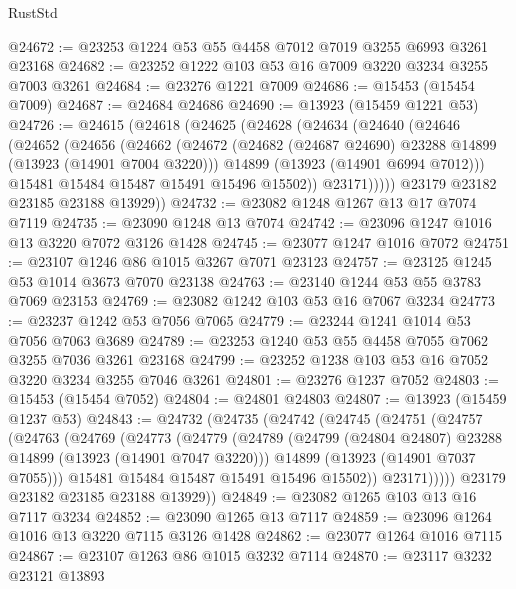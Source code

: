 \begin{lexlean}{RustStd}
\begin{coremodule}
@24672 := @23253 @1224 @53 @55 @4458 @7012 @7019 @3255 @6993 @3261 @23168
@24682 := @23252 @1222 @103 @53 @16 @7009 @3220 @3234 @3255 @7003 @3261
@24684 := @23276 @1221 @7009
@24686 := @15453 (@15454 @7009)
@24687 := @24684 @24686
@24690 := @13923 (@15459 @1221 @53)
@24726 := @24615
    (@24618
      (@24625
        (@24628
          (@24634
            (@24640
              (@24646
                (@24652
                  (@24656
                    (@24662
                      (@24672
                        (@24682 (@24687 @24690) @23288 @14899 (@13923 (@14901 @7004 @3220)))
                        @14899
                        (@13923 (@14901 @6994 @7012)))
                      @15481
                      @15484
                      @15487
                      @15491
                      @15496
                      @15502))
                  @23171)))))
        @23179
        @23182
        @23185
        @23188
        @13929))
@24732 := @23082 @1248 @1267 @13 @17 @7074 @7119
@24735 := @23090 @1248 @13 @7074
@24742 := @23096 @1247 @1016 @13 @3220 @7072 @3126 @1428
@24745 := @23077 @1247 @1016 @7072
@24751 := @23107 @1246 @86 @1015 @3267 @7071 @23123
@24757 := @23125 @1245 @53 @1014 @3673 @7070 @23138
@24763 := @23140 @1244 @53 @55 @3783 @7069 @23153
@24769 := @23082 @1242 @103 @53 @16 @7067 @3234
@24773 := @23237 @1242 @53 @7056 @7065
@24779 := @23244 @1241 @1014 @53 @7056 @7063 @3689
@24789 := @23253 @1240 @53 @55 @4458 @7055 @7062 @3255 @7036 @3261 @23168
@24799 := @23252 @1238 @103 @53 @16 @7052 @3220 @3234 @3255 @7046 @3261
@24801 := @23276 @1237 @7052
@24803 := @15453 (@15454 @7052)
@24804 := @24801 @24803
@24807 := @13923 (@15459 @1237 @53)
@24843 := @24732
    (@24735
      (@24742
        (@24745
          (@24751
            (@24757
              (@24763
                (@24769
                  (@24773
                    (@24779
                      (@24789
                        (@24799 (@24804 @24807) @23288 @14899 (@13923 (@14901 @7047 @3220)))
                        @14899
                        (@13923 (@14901 @7037 @7055)))
                      @15481
                      @15484
                      @15487
                      @15491
                      @15496
                      @15502))
                  @23171)))))
        @23179
        @23182
        @23185
        @23188
        @13929))
@24849 := @23082 @1265 @103 @13 @16 @7117 @3234
@24852 := @23090 @1265 @13 @7117
@24859 := @23096 @1264 @1016 @13 @3220 @7115 @3126 @1428
@24862 := @23077 @1264 @1016 @7115
@24867 := @23107 @1263 @86 @1015 @3232 @7114
@24870 := @23117 @3232 @23121 @13893

\end{coremodule}
\end{lexlean}
